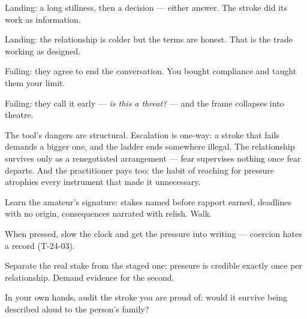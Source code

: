 \begin{feedback}
  \item Landing: a long stillness, then a decision --- either answer. The stroke did its work as information.
  \item Landing: the relationship is colder but the terms are honest. That is the trade working as designed.
  \item Failing: they agree to end the conversation. You bought compliance and taught them your limit.
  \item Failing: they call it early --- \emph{is this a threat?} --- and the frame collapses into theatre.
\end{feedback}
\begin{failure}
The tool's dangers are structural. Escalation is one-way: a stroke that fails demands a bigger one, and the ladder ends somewhere illegal. The relationship survives only as a renegotiated arrangement --- fear supervises nothing once fear departs. And the practitioner pays too: the habit of reaching for pressure atrophies every instrument that made it unnecessary.
\end{failure}
\begin{countermeasures}
  \item Learn the amateur's signature: stakes named before rapport earned, deadlines with no origin, consequences narrated with relish. Walk.
  \item When pressed, slow the clock and get the pressure into writing --- coercion hates a record (T-24-03).
  \item Separate the real stake from the staged one: pressure is credible exactly once per relationship. Demand evidence for the second.
  \item In your own hands, audit the stroke you are proud of: would it survive being described aloud to the person's family?
\end{countermeasures}

\seesources
{}
